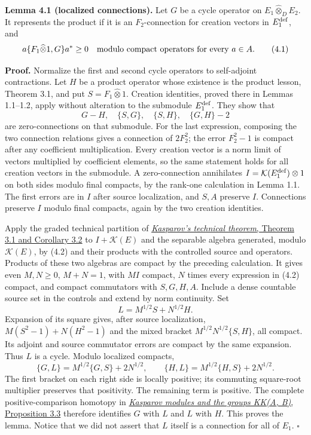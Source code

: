 \documentclass[
  11pt,
]{article}
\begin{document}
\textbf{Lemma 4.1 (localized connections).} Let \(G\) be a cycle
operator on \(E_1\widehat\otimes_D E_2\). It represents the product if
it is an \(F_2\)-connection for creation vectors in \(E_1^{\rm def}\),
and \[
 a\{F_1\widehat\otimes1,G\}a^*\geq0
 \quad\hbox{modulo compact operators for every }a\in A.
 \tag{4.1}
\]

\textbf{Proof.} Normalize the first and second cycle operators to
self-adjoint contractions. Let \(H\) be a product operator whose
existence is the product lesson, Theorem 3.1, and put
\(S=F_1\widehat\otimes1\). Creation identities, proved there in Lemmas
1.1--1.2, apply without alteration to the submodule \(E_1^{\rm def}\).
They show that \[
 G-H,\quad\{S,G\},\quad\{S,H\},\quad\{G,H\}-2
 \tag{4.2}
\] are zero-connections on that submodule. For the last expression,
composing the two connection relations gives a connection of \(2F_2^2\);
the error \(F_2^2-1\) is compact after any coefficient multiplication.
Every creation vector is a norm limit of vectors multiplied by
coefficient elements, so the same statement holds for all creation
vectors in the submodule. A zero-connection annihilates
\(I=\mathcal K(E_1^{\rm def})\otimes1\) on both sides modulo final
compacts, by the rank-one calculation in Lemma 1.1. The first errors are
in \(I\) after source localization, and \(S,A\) preserve \(I\).
Connections preserve \(I\) modulo final compacts, again by the two
creation identities.

Apply the graded technical partition of
\href{KT-KK-08.html\#3-grading-and-square-roots}{\emph{Kasparov's
technical theorem}, Theorem 3.1 and Corollary 3.2} to
\(I+\mathcal K(E)\) and the separable algebra generated, modulo
\(\mathcal K(E)\), by (4.2) and their products with the controlled
source and operators. Products of these two algebras are compact by the
preceding calculation. It gives even \(M,N\geq0\), \(M+N=1\), with
\(MI\) compact, \(N\) times every expression in (4.2) compact, and
compact commutators with \(S,G,H,A\). Include a dense countable source
set in the controls and extend by norm continuity. Set \[
 L=M^{1/2}S+N^{1/2}H.
\] Expansion of its square gives, after source localization,
\(M(S^2-1)+N(H^2-1)\) and the mixed bracket \(M^{1/2}N^{1/2}\{S,H\}\),
all compact. Its adjoint and source commutator errors are compact by the
same expansion. Thus \(L\) is a cycle. Modulo localized compacts, \[
 \{G,L\}=M^{1/2}\{G,S\}+2N^{1/2},\qquad
 \{H,L\}=M^{1/2}\{H,S\}+2N^{1/2}.
\] The first bracket on each right side is locally positive; its
commuting square-root multiplier preserves that positivity. The
remaining term is positive. The complete positive-comparison homotopy in
\href{KT-KK-06.html\#proposition-3-3-the-positive-comparison-criterion}{\emph{Kasparov
modules and the groups KK(A, B)}, Proposition 3.3} therefore identifies
\(G\) with \(L\) and \(L\) with \(H\). This proves the lemma. Notice
that we did not assert that \(L\) itself is a connection for all of
\(E_1\). \(\square\)
\end{document}
